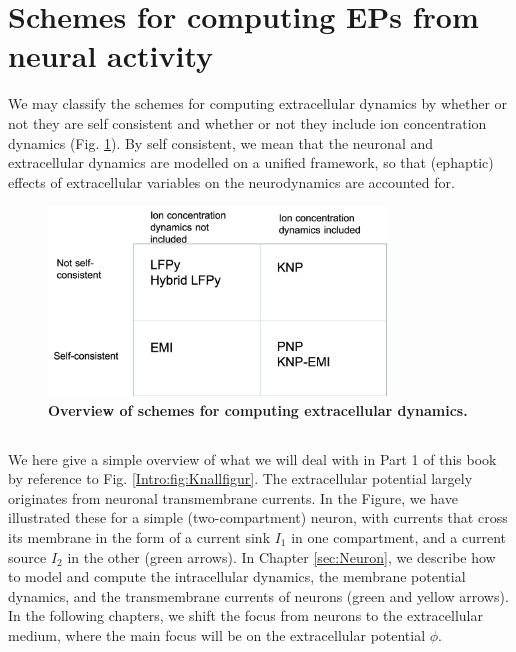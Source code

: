 \section{Schemes for computing EPs from neural activity}
\label{sec:Schemes}

We may classify the schemes for computing extracellular dynamics by whether or not they are self consistent and whether or not they include ion concentration dynamics (Fig. \ref{Schemes:fig:schemes}). By self consistent, we mean that the neuronal and extracellular dynamics are modelled on a unified framework, so that (ephaptic) effects of extracellular variables on the neurodynamics are accounted for. 


\begin{figure}[!ht]
\begin{center}
\includegraphics[width=0.8\textwidth]{Figures/Schemes/schemes.png}
\end{center}
\caption{\textbf{Overview of schemes for computing extracellular dynamics.}}
\label{Schemes:fig:schemes}
\end{figure}

\subsection{}


We here give a simple overview of what we will deal with in Part 1 of this book by reference to Fig. \ref{Intro:fig:Knallfigur}. The extracellular potential largely originates from neuronal transmembrane currents. In the Figure, we have illustrated these for a simple (two-compartment) neuron, with currents that cross its membrane in the form of a current sink $I_1$ in one compartment, and a current source $I_2$ in the other (green arrows). In Chapter \ref{sec:Neuron}, we describe how to model and compute the intracellular dynamics, the membrane potential dynamics, and the transmembrane currents of neurons (green and yellow arrows). In the following chapters, we shift the focus from neurons to the extracellular medium, where the main focus will be on the extracellular potential $\phi$.

